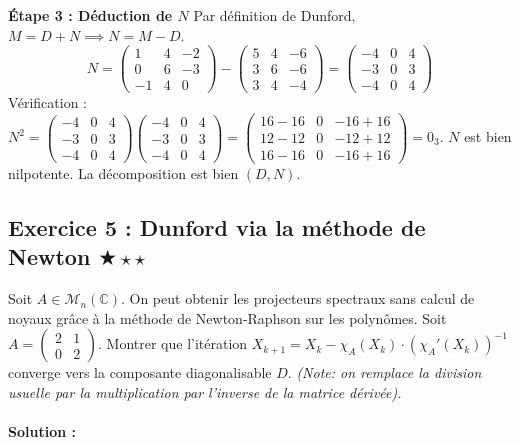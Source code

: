 \documentclass[11pt,a4paper]{article}
\begin{document}
\textbf{Étape 3 : Déduction de $N$}
Par définition de Dunford, $M = D + N \implies N = M - D$.
$$ N = \begin{pmatrix} 1 & 4 & -2 \\ 0 & 6 & -3 \\ -1 & 4 & 0 \end{pmatrix} - \begin{pmatrix} 5 & 4 & -6 \\ 3 & 6 & -6 \\ 3 & 4 & -4 \end{pmatrix} = \begin{pmatrix} -4 & 0 & 4 \\ -3 & 0 & 3 \\ -4 & 0 & 4 \end{pmatrix} $$
Vérification : $N^2 = \begin{pmatrix} -4 & 0 & 4 \\ -3 & 0 & 3 \\ -4 & 0 & 4 \end{pmatrix} \begin{pmatrix} -4 & 0 & 4 \\ -3 & 0 & 3 \\ -4 & 0 & 4 \end{pmatrix} = \begin{pmatrix} 16-16 & 0 & -16+16 \\ 12-12 & 0 & -12+12 \\ 16-16 & 0 & -16+16 \end{pmatrix} = 0_3$. $N$ est bien nilpotente.
La décomposition est bien $(D, N)$.

\vspace{1cm}
\subsection*{Exercice 5 : Dunford via la méthode de Newton $\bigstar\star\star$}

Soit $A \in \mathcal{M}_n(\mathbb{C})$. On peut obtenir les projecteurs spectraux sans calcul de noyaux grâce à la méthode de Newton-Raphson sur les polynômes.
Soit $A = \begin{pmatrix} 2 & 1 \\ 0 & 2 \end{pmatrix}$. Montrer que l'itération $X_{k+1} = X_k - \chi_A(X_k) \cdot (\chi_A'(X_k))^{-1}$ converge vers la composante diagonalisable $D$.
\textit{(Note: on remplace la division usuelle par la multiplication par l'inverse de la matrice dérivée).}

\paragraph*{Solution :}
\end{document}
